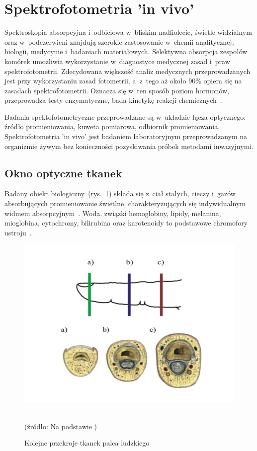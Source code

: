 \section{Spektrofotometria 'in vivo'}
\label{sec:InVivo}

Spektroskopia absorpcyjna i~odbiciowa w~bliskim nadfiolecie, świetle widzialnym oraz w~podczerwieni znajdują szerokie zastosowanie w~chemii analitycznej, 
biologii, medycynie i~badaniach materiałowych.
Selektywna absorpcja zespołów komórek umożliwia wykorzystanie w~diagnostyce medycznej zasad i~praw spektrofotometrii. Zdecydowana większość analiz 
medycznych przeprowadzanych jest przy wykorzystaniu zasad fotometrii, a~z~tego aż około 90\% opiera się na zasadach spektrofotometrii. Oznacza 
się w~ten sposób poziom hormonów, przeprowadza testy enzymatyczne, bada kinetykę reakcji chemicznych~\cite{Cys:2007}. 

Badania spektofotometryczne przeprowadzane są w~układzie łącza optycznego: źródło promieniowania, kuweta pomiarowa, odbiornik promieniowania.
Spektrofotometria 'in vivo' jest badaniem laboratoryjnym przeprowadzanym na organizmie żywym bez konieczności pozyskiwania próbek metodami inwazyjnymi.

\subsection{Okno optyczne tkanek}
\label{subsec:OknoOptyczne}

Badany obiekt biologiczny~(rys.~\ref{rys:finger}) składa się z~ciał stałych, cieczy i~gazów absorbujących promieniowanie świetlne, 
charakteryzujących się indywidualnym widmem absorpcyjnym~\cite{Nui:2007}. Woda, związki hemoglobiny, lipidy, melanina, mioglobina, 
cytochromy, bilirubina oraz karotenoidy to podstawowe chromofory ustroju~\cite{Haggblad:2008}. 

\begin{figure}[ht]
\centerline{\includegraphics[scale = 0.56]{graphic/finger.png}}
	\caption{Kolejne przekroje tkanek palca ludzkiego}
	\label{rys:finger}
	~\\
	(źródło: Na podstawie \cite{Cys:2007})
\end{figure}

